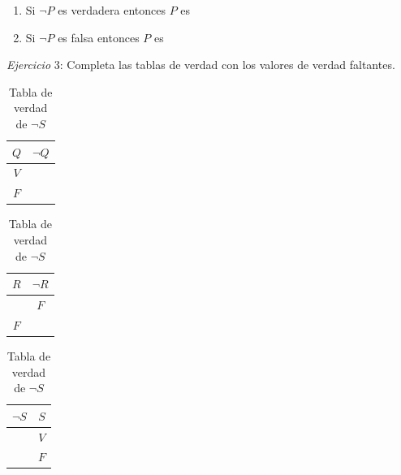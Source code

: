 \documentclass[letterpaper, twoside]{article}
\begin{document}
\begin{enumerate}
  \item Si $\neg P$ es verdadera entonces $P$ es \hrulefill
  \item Si $\neg P$ es falsa entonces $P$ es \hrulefill
\end{enumerate}

\vspace{1cm}

\textit{Ejercicio} 3: Completa las tablas de verdad con los valores de verdad faltantes.

\vspace{.5cm}

\begin{table}[h]
  
  \centering
  \begin{minipage}[t]{0.31\textwidth}
    \centering
    \begin{tabular}{|c|c|}
      \hline
      $Q$ & $\neg Q$ \\ \hline
      $V$ & \\ \hline
      $F$ & \\
      \hline
    \end{tabular}
    \caption*{Tabla de verdad de $\neg Q$}
  \end{minipage}
  \hfil
  \begin{minipage}[t]{0.31\textwidth}
    \centering
    \begin{tabular}{|c|c|}
      \hline
      $R$ & $\neg R$ \\ \hline
          & $F$ \\ \hline
      $F$ & \\
      \hline
    \end{tabular}
    \caption*{Tabla de verdad de $\neg R$}
  \end{minipage}
  \begin{minipage}[t]{0.31\textwidth}
    \centering
    \begin{tabular}{|c|c|}
      \hline
      $\neg S$ & $S$ \\ \hline
        & $V$\\ \hline
        & $F$ \\
      \hline
    \end{tabular}
    \caption*{Tabla de verdad de $\neg S$}
  \end{minipage}

\end{table}

\end{document}
